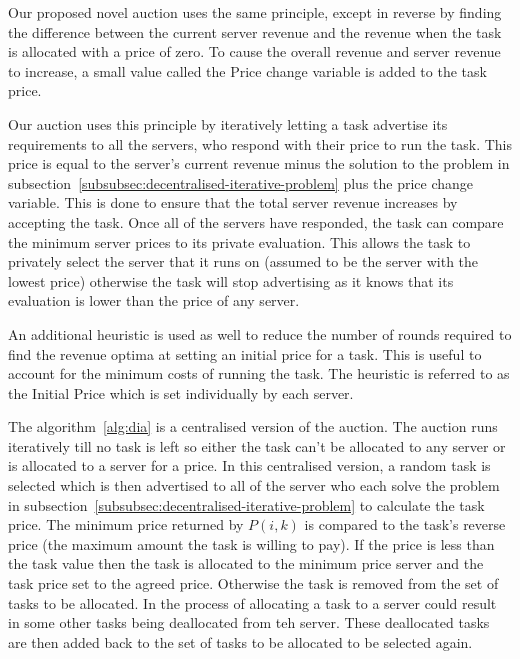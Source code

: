 Our proposed novel auction uses the same principle, except in reverse by finding the difference between the current
server revenue and the revenue when the task is allocated with a price of zero. To cause the overall revenue and
server revenue to increase, a small value called the Price change variable is added to the task price.

Our auction uses this principle by iteratively letting a task advertise its requirements to all the servers, who
respond with their price to run the task. This price is equal to the server's current revenue minus the solution to the
problem in subsection~\ref{subsubsec:decentralised-iterative-problem} plus the price change variable. This is done to
ensure that the total server revenue increases by accepting the task. Once all of the servers have responded, the task
can compare the minimum server prices to its private evaluation. This allows the task to privately select the server
that it runs on (assumed to be the server with the lowest price) otherwise the task will stop advertising as it knows
that its evaluation is lower than the price of any server.

An additional heuristic is used as well to reduce the number of rounds required to find the revenue optima at setting
an initial price for a task. This is useful to account for the minimum costs of running the task. The heuristic
is referred to as the Initial Price which is set individually by each server.

The algorithm~\ref{alg:dia} is a centralised version of the auction. The auction runs iteratively till no task is left
so either the task can't be allocated to any server or is allocated to a server for a price. In this centralised version,
a random task is selected which is then advertised to all of the server who each solve the problem in
subsection~\ref{subsubsec:decentralised-iterative-problem} to calculate the task price. The minimum price returned by
$P(i, k)$ is compared to the task's reverse price (the maximum amount the task is willing to pay). If the price is less
than the task value then the task is allocated to the minimum price server and the task price set to the agreed price.
Otherwise the task is removed from the set of tasks to be allocated. In the process of allocating a task to a server
could result in some other tasks being deallocated from teh server. These deallocated tasks are then added back to the
set of tasks to be allocated to be selected again.

